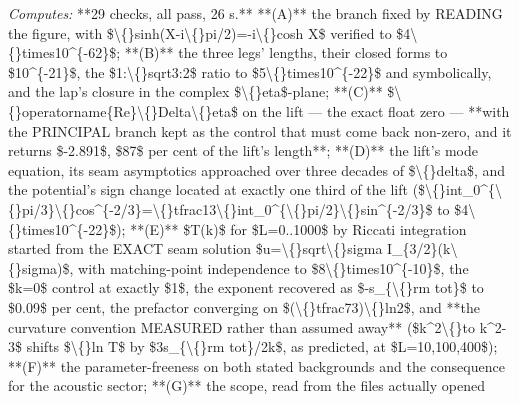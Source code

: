 \begin{description}
\emph{Computes:} **29 checks, all pass, 26 s.** **(A)** the branch fixed by READING the figure, with \$\textbackslash\{\}sinh(X-i\textbackslash\{\}pi/2)=-i\textbackslash\{\}cosh X\$ verified to \$4\textbackslash\{\}times10\textasciicircum{}\{-62\}\$; **(B)** the three legs' lengths, their closed forms to \$10\textasciicircum{}\{-21\}\$, the \$1:\textbackslash\{\}sqrt3:2\$ ratio to \$5\textbackslash\{\}times10\textasciicircum{}\{-22\}\$ and symbolically, and the lap's closure in the complex \$\textbackslash\{\}eta\$-plane; **(C)** \$\textbackslash\{\}operatorname\{Re\}\textbackslash\{\}Delta\textbackslash\{\}eta\$ on the lift --- the exact float zero --- **with the PRINCIPAL branch kept as the control that must come back non-zero, and it returns \$-2.891\$, \$87\$ per cent of the lift's length**; **(D)** the lift's mode equation, its seam asymptotics approached over three decades of \$\textbackslash\{\}delta\$, and the potential's sign change located at exactly one third of the lift (\$\textbackslash\{\}int\_0\textasciicircum{}\{\textbackslash\{\}pi/3\}\textbackslash\{\}cos\textasciicircum{}\{-2/3\}=\textbackslash\{\}tfrac13\textbackslash\{\}int\_0\textasciicircum{}\{\textbackslash\{\}pi/2\}\textbackslash\{\}sin\textasciicircum{}\{-2/3\}\$ to \$4\textbackslash\{\}times10\textasciicircum{}\{-22\}\$); **(E)** \$T(k)\$ for \$L=0..1000\$ by Riccati integration started from the EXACT seam solution \$u=\textbackslash\{\}sqrt\textbackslash\{\}sigma I\_\{3/2\}(k\textbackslash\{\}sigma)\$, with matching-point independence to \$8\textbackslash\{\}times10\textasciicircum{}\{-10\}\$, the \$k=0\$ control at exactly \$1\$, the exponent recovered as \$-s\_\{\textbackslash\{\}rm tot\}\$ to \$0.09\$ per cent, the prefactor converging on \$(\textbackslash\{\}tfrac73)\textbackslash\{\}ln2\$, and **the curvature convention MEASURED rather than assumed away** (\$k\textasciicircum{}2\textbackslash\{\}to k\textasciicircum{}2-3\$ shifts \$\textbackslash\{\}ln T\$ by \$3s\_\{\textbackslash\{\}rm tot\}/2k\$, as predicted, at \$L=10,100,400\$); **(F)** the parameter-freeness on both stated backgrounds and the consequence for the acoustic sector; **(G)** the scope, read from the files actually opened

\end{description}
